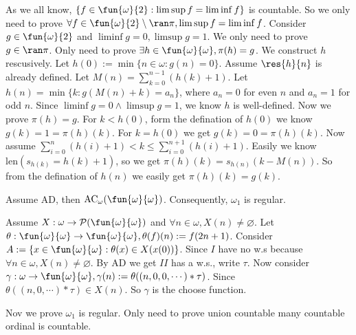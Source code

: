 \documentclass{ctexart}
\begin{document}
\begin{solution}
  As we all know, \(\{f \in \fun{\omega}{2}:\limsup f=\liminf f\}\) is countable. So we only need to prove \(\forall f \in \fun{\omega}{2}\setminus \ran \pi,\limsup f = \liminf f\). 
  Consider \(g \in \fun{\omega}{2}\) and \(\liminf g=0,\limsup g=1\). We only need to prove \(g \in \ran \pi\). 
  Only need to prove \(\exists h \in \fun{ \omega}{\omega},\pi(h)=g\). 
  We construct \(h\) rescusively. Let \(h(0):=\min\{n \in \omega:g(n)=0\}\). 
  Assume \(\res{h}{n}\) is already defined. Let \(M(n)=\sum_{k=0}^{n-1} (h(k)+1) \). 
  Let \(h(n)= \min\{k:g(M(n)+k)=a_n\}\), where \(a_n=0\) for even \(n\) and \(a_n=1\) for odd \(n\). 
  Since \(\liminf g=0 \wedge \limsup g=1\), we know \(h\) is well-defined. Now we prove \(\pi(h)=g\). 
  For \(k<h(0)\), form the defination of \(h(0)\) we know \(g(k)=1=\pi(h)(k)\). 
  For \(k=h(0)\) we get \(g(k)=0=\pi(h)(k)\). 
  Now assume \(\sum_{i=0}^{n} (h(i)+1) <k \leq \sum_{i=0}^{n+1} (h(i)+1)\). 
  Easily we know \(\mathrm{len}(s_{h(k)}=h(k)+1)\), so we get \(\pi(h)(k)=s_{h(n)}(k-M(n) )\). 
  So from the defination of \(h(n)\) we easily get \(\pi(h)(k)=g(k)\). 
\end{solution}

\begin{problem}
  Assume AD, then \(\mathrm{AC}_\omega(\fun{\omega}{\omega}) \). Consequently, \(\omega_1\) is regular. 
\end{problem}

\begin{solution}
  Assume \(X:\omega \to \mathcal{P}(\fun{\omega}{\omega})\) and \(\forall n \in \omega,X(n)\neq \varnothing\). 
  Let \(\theta:\fun{\omega}{\omega}\to \fun{\omega}{\omega},\theta(f)(n):=f(2n+1)\). 
  Consider \(A:=\{x \in \fun{\omega}{\omega}:\theta(x) \in X(x(0))\}\). 
  Since \(I\) have no w.s because \(\forall n \in \omega,X(n)\neq \varnothing\). 
  By AD we get \(II\) has a w.s., write \(\tau\). 
  Now consider \(\gamma:\omega \to \fun{\omega}{\omega},\gamma(n):=\theta((n,0,0,\cdots)*\tau)\). 
  Since \(\theta((n,0,\cdots)*\tau) \in X(n)\). So \(\gamma\) is the choose function. 
  
  Nov we prove \(\omega_1\) is regular. Only need to prove union countable many countable ordinal is countable. 
  
\end{solution}
\end{document}
